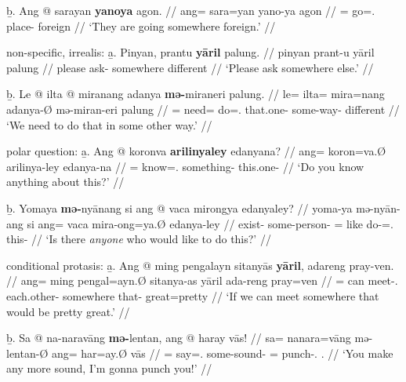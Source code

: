 	\b{b.} \begingl
		\gla Ang @ sarayan \textbf{yanoya} agon. //
		\glb ang= sara=yan yano-ya agon //
		\glc \AgtT{}= go=\TplM{}.\Top{} place-\Loc{} foreign //
		\glft `They are going somewhere foreign.' //
		\endgl
	\endsubsub

\a non-specific, irrealis:\vspace{.5em} %
	\beginsubsub
	\b{a.} \begingl
		\gla Pinyan, prantu \textbf{yāril} palung. //
		\glb pinyan prant-u yāril palung //
		\glc please ask-\Imp{} somewhere different //
		\glft `Please ask somewhere else.' //
		\endgl\vspace{.5em}
		
	\b{b.} \begingl
		\gla Le @ ilta @ miranang adanya \textbf{mə-}miraneri 
			palung. //
		\glb le= ilta= mira=nang adanya-Ø mə-miran-eri palung //
		\glc \PatTI{}= need= do=\Fsg{}.\Aarg{} that.one-\Top{} 
			some-way-\Ins{} different //
		\glft `We need to do that in some other way.' //
		\endgl
	\endsubsub

\a polar question:\vspace{.5em} %
	\beginsubsub
	\b{a.} \begingl
		\gla Ang @ koronva \textbf{arilinyaley} edanyana? //
		\glb ang= koron=va.Ø arilinya-ley edanya-na //
		\glc \AgtT{}= know=\Second{}.\Top{} something-\PargI{} 
			this.one-\Gen{} //
		\glft `Do you know anything about this?' //
		\endgl\vspace{.5em}
		
	\b{b.} \begingl
		\gla Yomaya \textbf{mə-}nyānang si ang @ vaca mirongya 
			edanyaley? //
		\glb yoma-ya mə-nyān-ang si ang= vaca mira-ong=ya.Ø
			edanya-ley //
		\glc exist-\TsgM{} some-person-\Aarg{} \Rel{} \AgtT{}= 
			like do-\Irr{}=\TsgM{}.\Top{} this-\PargI{} //
		\glft `Is there \emph{anyone} who would like to do this?' //
		\endgl
	\endsubsub

\a conditional protasis:\vspace{.5em} %
	\beginsubsub
	\b{a.} \begingl
		\gla Ang @ ming pengalayn sitanyās \textbf{yāril}, adareng 
			pray-ven. //
		\glb ang= ming pengal=ayn.Ø sitanya-as yāril ada-reng 
			pray=ven //
		\glc \AgtT{}= can meet-\Fpl{}.\Top{} each.other-\Parg{} 
			somewhere that-\AargI{} great=pretty //
		\glft `If we can meet somewhere that would be pretty great.' //
		\endgl\vspace{.5em}
		
	\b{b.} \begingl
		\gla Sa @ na-naravāng \textbf{mə-}lentan, ang @ haray vās! //
		\glb sa= na\til{}nara=vāng mə-lentan-Ø ang= har=ay.Ø vās //
		\glc \PatT{}= \Iter{}\til{}say=\Second{}.\Aarg{} some-sound-\Top{} 
			\AgtT{}= punch-\Fsg{}.\Top{} \Second{}.\Parg{} //
		\glft `You make any more sound, I'm gonna punch you!' //
		\endgl
	\endsubsub


